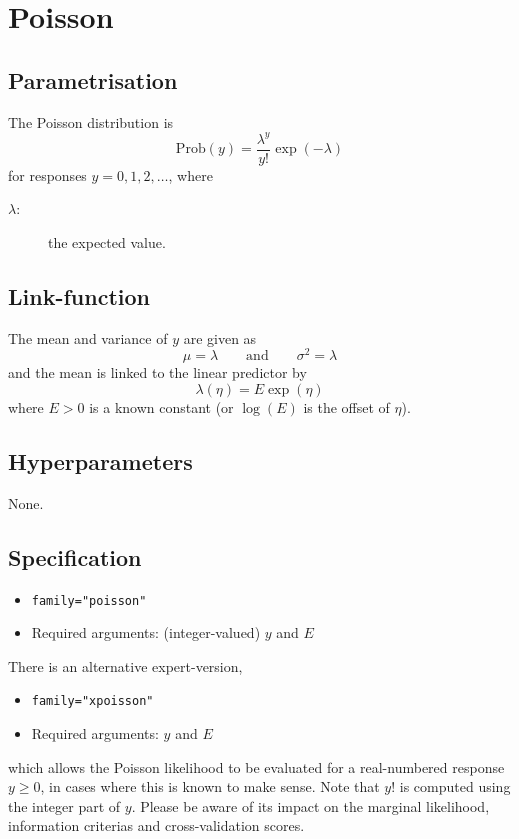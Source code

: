 \documentclass[a4paper,11pt]{article}
\begin{document}
\section*{Poisson}

\subsection*{Parametrisation}

The Poisson distribution is
\begin{displaymath}
    \text{Prob}(y) = \frac{\lambda^{y}}{y!}\exp(-\lambda)
\end{displaymath}
for responses $y=0, 1, 2, \ldots$, where
\begin{description}
\item[$\lambda$:] the expected value.
\end{description}

\subsection*{Link-function}

The mean and variance of $y$ are given as
\begin{displaymath}
    \mu = \lambda \qquad\text{and}\qquad \sigma^{2} = \lambda
\end{displaymath}
and the mean is linked to the linear predictor by
\begin{displaymath}
    \lambda(\eta) = E \exp(\eta)
\end{displaymath}
where $E>0$ is a known constant (or $\log(E)$ is the offset of $\eta$).

\subsection*{Hyperparameters}

None.

\subsection*{Specification}

\begin{itemize}
\item \texttt{family="poisson"}
\item Required arguments: (integer-valued) $y$ and $E$
\end{itemize}

\noindent There is an alternative expert-version,
\begin{itemize}
\item \texttt{family="xpoisson"}
\item Required arguments: $y$ and $E$
\end{itemize}
which allows the Poisson likelihood to be evaluated for a
real-numbered response $y\ge0$, in cases where this is known to make
sense. Note that $y!$ is computed using the integer part of $y$.
Please be aware of its impact on the marginal likelihood, information
criterias and cross-validation scores.
\end{document}

